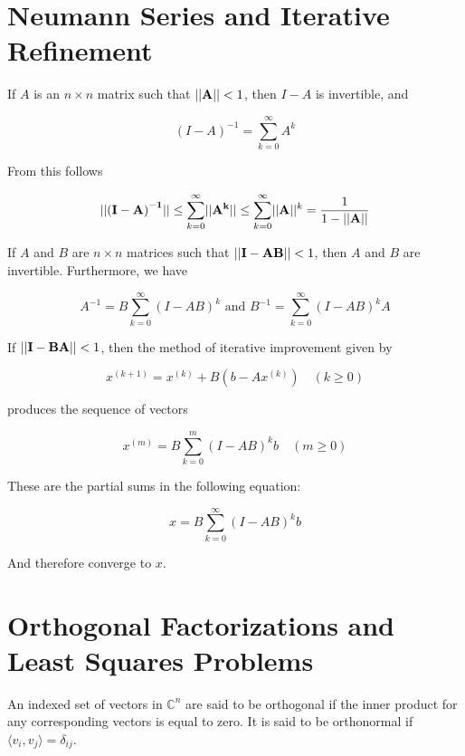 \section{Neumann Series and Iterative Refinement}
    \begin{thm}
        If $A$ is an $n \times n$ matrix such that $\lvert \lvert \mathbf{A} \rvert \rvert < 1$, then $I - A$ is invertible, and

        \[ {(I - A)}^{-1} = \sum_{k = 0}^\infty A^k \]
    \end{thm}

    From this follows

    \[
        \lvert \lvert \mathbf{{(I - A)}^{-1}} \rvert \rvert \le \sum_{k = 0}^\infty \lvert \lvert \mathbf{A^k} \rvert \rvert \le
        \sum_{k = 0}^\infty \lvert \lvert \mathbf{A} \rvert \rvert^k =
        \frac{1}{1 - \lvert \lvert \mathbf{A} \rvert \rvert}
    \]

    \begin{thm}
        If $A$ and $B$ are $n \times n$ matrices such that $\lvert \lvert \mathbf{I - AB} \rvert \rvert < 1$, then $A$ and $B$ are invertible.
        Furthermore, we have

        \[
            A^{-1} = B \sum_{k=0}^\infty {(I - AB)}^k \text{  and  } B^{-1} = \sum_{k=0}^\infty {(I - AB)}^kA
        \]
    \end{thm}

    \begin{thm}
        If $\lvert \lvert \mathbf{I - BA} \rvert \rvert < 1$, then the method of iterative improvement given by

        \[
            x^{(k + 1)} = x^{(k)} + B(b - Ax^{(k)}) \quad (k \ge 0)
        \]

        produces the sequence of vectors

        \[
            x^{(m)} = B \sum_{k = 0}^m {(I - AB)}^k b \quad (m \ge 0)
        \]

        These are the partial sums in the following equation:

        \[
            x = B \sum_{k = 0}^\infty {(I - AB)}^k b
        \]

        And therefore converge to $x$.
    \end{thm}

\section{Orthogonal Factorizations and Least Squares Problems}
An indexed set of vectors in $\mathbb{C}^n$ are said to be orthogonal if the inner product for any corresponding vectors
is equal to zero. It is said to be orthonormal if $\langle v_i, v_j \rangle = \delta_{ij}$.

